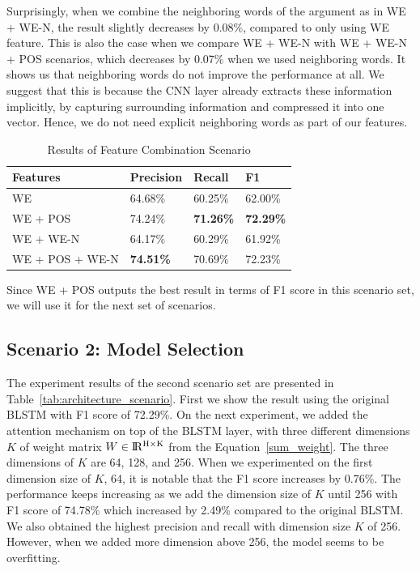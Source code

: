 Surprisingly, when we combine the neighboring words of the argument as in WE + WE-N, the result slightly decreases by 0.08\%, compared to only using WE feature. This is also the case when we compare WE + WE-N with WE + WE-N + POS scenarios, which decreases by 0.07\% when we used neighboring words. It shows us that neighboring words do not improve the performance at all. We suggest that this is because the CNN layer already extracts these information implicitly, by capturing surrounding information and compressed it into one vector. Hence, we do not need explicit neighboring words as part of our features. 

\begin{table}
	\caption{Results of Feature Combination Scenario}
	\label{tab:feature_scenario}
	\begin{tabular}{llll}
		\toprule
		Features		&Precision	&Recall		&F1			\\
		\midrule
		WE				&	64.68\%				&	60.25\%				&	62.00\%	\\
		WE + POS		&	74.24\%				&	\textbf{71.26\%}	&	\textbf{72.29\%}	\\
		WE + WE-N		&	64.17\%				&	60.29\%				&	61.92\%	\\
		WE + POS + WE-N	&	\textbf{74.51\%}	&	70.69\%				&	72.23\%	\\
		\bottomrule
	\end{tabular}
\end{table}

Since WE + POS outputs the best result in terms of F1 score in this scenario set, we will use it for the next set of scenarios.

\subsection{Scenario 2: Model Selection}
The experiment results of the second scenario set are presented in Table~\ref{tab:architecture_scenario}. First we show the result using the original BLSTM with F1 score of 72.29\%. On the next experiment, we added the attention mechanism on top of the BLSTM layer, with three different dimensions $K$ of weight matrix $W \in {\rm I\!R^{H \times K}}$ from the Equation~\ref{sum_weight}. The three dimensions of $K$ are 64, 128, and 256. When we experimented on the first dimension size of $K$, 64, it is notable that the F1 score increases by 0.76\%. The performance keeps increasing as we add the dimension size of $K$ until 256 with F1 score of 74.78\% which increased by 2.49\% compared to the original BLSTM. We also obtained the highest precision and recall with dimension size $K$ of 256. However, when we added more dimension above 256, the model seems to be overfitting.

